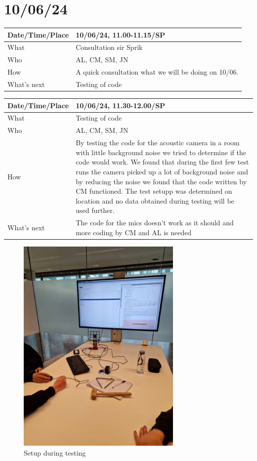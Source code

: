 \documentclass{article}
\begin{document}
\section{10/06/24}

\begin{table}[H]
\begin{tabular}{|p{1.5in}|p{4in}|}
\hline
Date/Time/Place &  10/06/24, 11.00-11.15/SP\\ \hline
What            &  Consultation sir Sprik\\ \hline
Who             &  AL, CM, SM, JN\\ \hline
How             &  A quick consultation what we will be doing on 10/06.  \\ \hline
What's next     &  Testing of code\\ \hline
\end{tabular}
\end{table}


\begin{table}[H]
\begin{tabular}{|p{1.5in}|p{4in}|}
\hline
Date/Time/Place & 10/06/24, 11.30-12.00/SP \\ \hline
What            &  Testing of code\\ \hline
Who             &  AL, CM, SM, JN\\ \hline
How             &  By testing the code for the acoustic camera in a room with little background noise we tried to determine if the code would work. We found that during the first few test runs the camera picked up a lot of background noise and by reducing the noise we found that the code written by CM functioned. The test setupp was determined on location and no data obtained during testing will be used further. \\ \hline
What's next     &  The code for the mics doesn't work as it should and more coding by CM and AL is needed\\ \hline
\end{tabular}
\end{table}
\begin{figure}[H]
    \centering
    \includegraphics[width=8cm, angle =270]{20240610_113743.jpg}
    \caption{Setup during testing}   
\end{figure}
\end{document}
